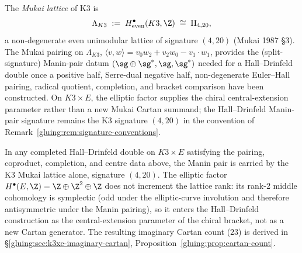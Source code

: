 \begin{definition}
\label{gluing:def:mukai-manin-pair}
The \emph{Mukai lattice} of K3 is
\[
 \Lambda_{K3} \;:=\; H^\bullet_{\text{even}}(K3, \Z)
 \;\cong\; \mathrm{II}_{4,20},
\]
a non-degenerate even unimodular lattice of signature $(4, 20)$
(Mukai 1987 \S 3). The Mukai pairing on $\Lambda_{K3}$,
$\langle v, w \rangle = v_0 w_2 + v_2 w_0 - v_1 \cdot w_1$,
provides the (split-signature) Manin-pair datum
$(\sg \oplus \sg^*, \sg, \sg^*)$ needed for a Hall--Drinfeld double
once a positive half, Serre-dual negative half, non-degenerate
Euler--Hall pairing, radical quotient, completion, and bracket
comparison have been constructed. On $K3 \times E$, the
elliptic factor supplies the chiral central-extension parameter rather
than a new Mukai Cartan summand; the Hall--Drinfeld Manin-pair
signature remains the K3 signature $(4,20)$ in the convention of
Remark~\ref{gluing:rem:signature-conventions}.
\end{definition}

\begin{remark}
\label{gluing:rem:signature-conventions}
In any completed Hall--Drinfeld double on $K3 \times E$ satisfying the
pairing, coproduct, completion, and centre data above, the Manin pair
is carried by the K3 Mukai lattice alone, signature $(4, 20)$. The elliptic factor
$H^\bullet(E, \Z) = \Z \oplus \Z^2 \oplus \Z$ does not increment
the lattice rank: its rank-$2$ middle cohomology is symplectic (odd
under the elliptic-curve involution and therefore antisymmetric
under the Manin pairing), so it enters the Hall--Drinfeld
construction as the central-extension parameter of the chiral
bracket, not as a new Cartan generator. The resulting imaginary
Cartan count ($23$) is derived in
\S\ref{gluing:sec:k3xe-imaginary-cartan},
Proposition~\ref{gluing:prop:cartan-count}.
\end{remark}

